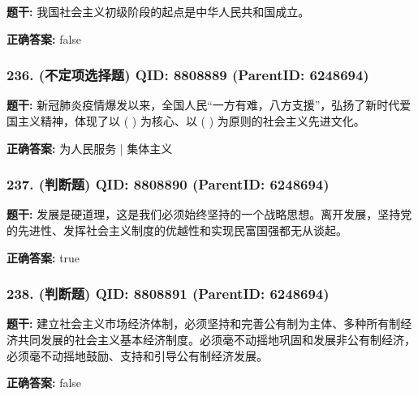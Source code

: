 \documentclass[12pt,UTF8]{ctexart}
\begin{document}
\textbf{题干:}
我国社会主义初级阶段的起点是中华人民共和国成立。



\textbf{正确答案:}
false

\vspace{0.3em}\hrulefill\vspace{0.7em}

\subsubsection*{236. (不定项选择题) \small QID: 8808889 (ParentID: 6248694)}

\textbf{题干:}
新冠肺炎疫情爆发以来，全国人民“一方有难，八方支援”，弘扬了新时代爱国主义精神，体现了以 ( ) 为核心、以  ( ) 为原则的社会主义先进文化。



\textbf{正确答案:}
为人民服务 | 集体主义

\vspace{0.3em}\hrulefill\vspace{0.7em}

\subsubsection*{237. (判断题) \small QID: 8808890 (ParentID: 6248694)}

\textbf{题干:}
发展是硬道理，这是我们必须始终坚持的一个战略思想。离开发展，坚持党的先进性、发挥社会主义制度的优越性和实现民富国强都无从谈起。



\textbf{正确答案:}
true

\vspace{0.3em}\hrulefill\vspace{0.7em}

\subsubsection*{238. (判断题) \small QID: 8808891 (ParentID: 6248694)}

\textbf{题干:}
建立社会主义市场经济体制，必须坚持和完善公有制为主体、多种所有制经济共同发展的社会主义基本经济制度。必须毫不动摇地巩固和发展非公有制经济，必须毫不动摇地鼓励、支持和引导公有制经济发展。



\textbf{正确答案:}
false

\vspace{0.3em}\hrulefill\vspace{0.7em}
\end{document}
